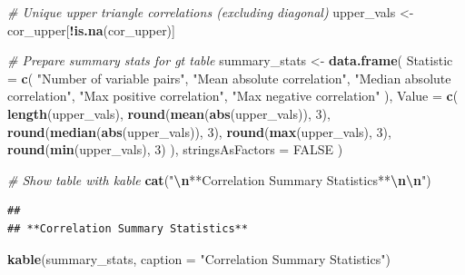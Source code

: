 \documentclass[
]{article}
\newenvironment{Shaded}{\begin{snugshade}}{\end{snugshade}}
\newcommand{\AttributeTok}[1]{\textcolor[rgb]{0.13,0.29,0.53}{#1}}
\newcommand{\CommentTok}[1]{\textcolor[rgb]{0.56,0.35,0.01}{\textit{#1}}}
\newcommand{\ConstantTok}[1]{\textcolor[rgb]{0.56,0.35,0.01}{#1}}
\newcommand{\DecValTok}[1]{\textcolor[rgb]{0.00,0.00,0.81}{#1}}
\newcommand{\FunctionTok}[1]{\textcolor[rgb]{0.13,0.29,0.53}{\textbf{#1}}}
\newcommand{\NormalTok}[1]{#1}
\newcommand{\OtherTok}[1]{\textcolor[rgb]{0.56,0.35,0.01}{#1}}
\newcommand{\SpecialCharTok}[1]{\textcolor[rgb]{0.81,0.36,0.00}{\textbf{#1}}}
\newcommand{\StringTok}[1]{\textcolor[rgb]{0.31,0.60,0.02}{#1}}
\begin{document}
\begin{Shaded}
\begin{Highlighting}[]
\CommentTok{\# Unique upper triangle correlations (excluding diagonal)}
\NormalTok{upper\_vals }\OtherTok{\textless{}{-}}\NormalTok{ cor\_upper[}\SpecialCharTok{!}\FunctionTok{is.na}\NormalTok{(cor\_upper)]}

\CommentTok{\# Prepare summary stats for gt table}
\NormalTok{summary\_stats }\OtherTok{\textless{}{-}} \FunctionTok{data.frame}\NormalTok{(}
  \AttributeTok{Statistic =} \FunctionTok{c}\NormalTok{(}
    \StringTok{"Number of variable pairs"}\NormalTok{,}
    \StringTok{"Mean absolute correlation"}\NormalTok{,}
    \StringTok{"Median absolute correlation"}\NormalTok{,}
    \StringTok{"Max positive correlation"}\NormalTok{,}
    \StringTok{"Max negative correlation"}
\NormalTok{  ),}
  \AttributeTok{Value =} \FunctionTok{c}\NormalTok{(}
    \FunctionTok{length}\NormalTok{(upper\_vals),}
    \FunctionTok{round}\NormalTok{(}\FunctionTok{mean}\NormalTok{(}\FunctionTok{abs}\NormalTok{(upper\_vals)), }\DecValTok{3}\NormalTok{),}
    \FunctionTok{round}\NormalTok{(}\FunctionTok{median}\NormalTok{(}\FunctionTok{abs}\NormalTok{(upper\_vals)), }\DecValTok{3}\NormalTok{),}
    \FunctionTok{round}\NormalTok{(}\FunctionTok{max}\NormalTok{(upper\_vals), }\DecValTok{3}\NormalTok{),}
    \FunctionTok{round}\NormalTok{(}\FunctionTok{min}\NormalTok{(upper\_vals), }\DecValTok{3}\NormalTok{)}
\NormalTok{  ),}
  \AttributeTok{stringsAsFactors =} \ConstantTok{FALSE}
\NormalTok{)}

\CommentTok{\# Show table with kable}
\FunctionTok{cat}\NormalTok{(}\StringTok{"}\SpecialCharTok{\textbackslash{}n}\StringTok{**Correlation Summary Statistics**}\SpecialCharTok{\textbackslash{}n\textbackslash{}n}\StringTok{"}\NormalTok{)}
\end{Highlighting}
\end{Shaded}

\begin{verbatim}
## 
## **Correlation Summary Statistics**
\end{verbatim}

\begin{Shaded}
\begin{Highlighting}[]
\FunctionTok{kable}\NormalTok{(summary\_stats, }\AttributeTok{caption =} \StringTok{"Correlation Summary Statistics"}\NormalTok{)}
\end{Highlighting}
\end{Shaded}
\end{document}
